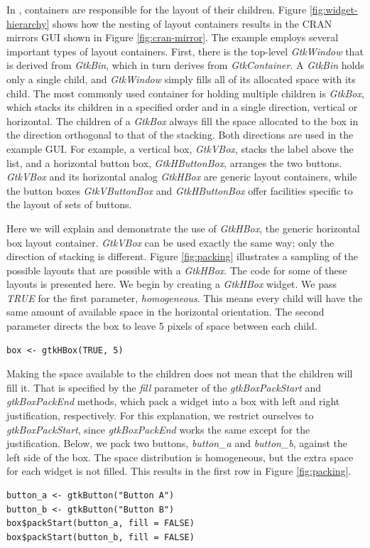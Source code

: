 \documentclass[article]{jss}
\begin{document}
In , containers are responsible for the layout
of their children. Figure \ref{fig:widget-hierarchy} shows how the nesting of 
layout containers results in the CRAN mirrors GUI shown in Figure 
\ref{fig:cran-mirror}. The example employs several important types of 
layout containers. First, there is the top-level \emph{GtkWindow} that
is derived from \emph{GtkBin}, which in turn derives from \emph{GtkContainer}.
A \emph{GtkBin} holds only a single child, and \emph{GtkWindow} simply fills all
of its allocated space with its child. The most commonly used container
for holding multiple children is \emph{GtkBox}, which stacks its children
in a specified order and in a single direction, vertical or horizontal. The 
children of a \emph{GtkBox} always fill the space allocated to the box in 
the direction orthogonal to that of the stacking. Both
directions are used in the example GUI. For example, a vertical box, \emph{GtkVBox},
stacks the label above the list, and a horizontal button box, \emph{GtkHButtonBox},
arranges the two buttons. \emph{GtkVBox} and its horizontal analog \emph{GtkHBox}
are generic layout containers, while the button boxes \emph{GtkVButtonBox} and 
\emph{GtkHButtonBox} offer facilities specific to the layout of sets of buttons.

Here we will explain and demonstrate the use of \emph{GtkHBox}, the generic
horizontal box layout container. \emph{GtkVBox} can be used exactly the same way;
only the direction of stacking is different. Figure \ref{fig:packing} illustrates
a sampling of the possible layouts that are possible with a \emph{GtkHBox}.
The code for some of these layouts is presented here.
We begin by creating a \emph{GtkHBox} widget. We pass \emph{TRUE} for the
first parameter, \emph{homogeneous}. This means every child will have the
same amount of available space in the horizontal orientation. The second 
parameter directs the box to leave 5 pixels of space between each child. 
\begin{verbatim}
box <- gtkHBox(TRUE, 5)
\end{verbatim}
Making the space available to the children does not mean that the children 
will fill it. That is specified by the \emph{fill} parameter of the 
\emph{gtkBoxPackStart} and \emph{gtkBoxPackEnd} methods, which pack a widget 
into a box with left and right justification, respectively. For this explanation,
we restrict ourselves to \emph{gtkBoxPackStart}, since \emph{gtkBoxPackEnd}
works the same except for the justification. Below, we pack two buttons, 
\emph{button\_a} and \emph{button\_b}, against
the left side of the box. The space distribution is homogeneous, but the
extra space for each widget is not filled. This results in the first row in 
Figure \ref{fig:packing}.
\begin{verbatim}
button_a <- gtkButton("Button A")
button_b <- gtkButton("Button B")
box$packStart(button_a, fill = FALSE)
box$packStart(button_b, fill = FALSE)
\end{verbatim}
\end{document}

